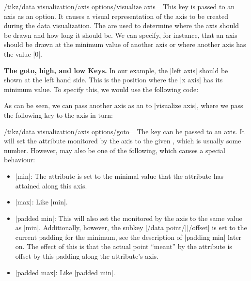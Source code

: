 \begin{key}{/tikz/data visualization/axis options/visualize axis=}
    This key is passed to an axis as an option. It causes a visual
    representation of the axis to be created during the data visualization. The
     are used to determine where the axis should be drawn and how
    long it should be. We can specify, for instance, that an axis should be
    drawn at the minimum value of another axis or where another axis has the
    value |0|.


    \medskip
    \textbf{The goto, high, and low Keys.}
    In our example, the |left axis| should be shown at the left hand side. This
    is the position where the |x axis| has its minimum value. To specify this,
    we would use the following code:
\begin{codeexample}[code only]
left axis={ visualize axis={ x axis={ goto=min } }
\end{codeexample}
    As can be seen, we can pass another axis as an  to
    |visualize axis|, where we pass the following key to the axis in turn:
    \begin{key}{/tikz/data visualization/axis options/goto=}
        The key can be passed to an axis. It will set the attribute monitored
        by the axis to the given , which is usually some number.
        However,  may also be one of the following, which causes a
        special behaviour:
        \begin{itemize}
            \item |min|: The attribute is set to the minimal value that the
                attribute has attained along this axis.
            \item |max|: Like |min|.
            \item |padded min|: This will also set the 
                monitored by the axis to the same value as |min|.
                Additionally, however, the subkey
                |/data point/||/offset| is set to the current
                padding for the minimum, see the description of |padding min|
                later on. The effect of this is that the actual point ``meant''
                by the attribute is offset by this padding along the
                attribute's axis.
            \item |padded max|: Like |padded min|.
        \end{itemize}
    \end{key}


\end{key}
